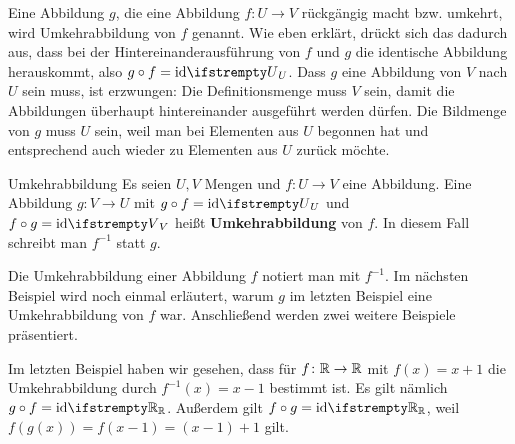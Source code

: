 \documentclass[../../main.tex]{subfiles}
\begin{document}
Eine Abbildung $g$, die eine Abbildung $f\colon U\rightarrow V$ rückgängig macht bzw. umkehrt, wird Umkehrabbildung von $f$ genannt. Wie eben erklärt, drückt sich das dadurch aus, dass bei der Hintereinanderausführung von $f$ und $g$ die identische Abbildung herauskommt, also $g\circ f=\ident[U]$. Dass $g$ eine Abbildung von $V$ nach $U$ sein muss, ist erzwungen: Die Definitionsmenge muss $V$ sein, damit die Abbildungen überhaupt hintereinander ausgeführt werden dürfen. Die Bildmenge von $g$ muss $U$ sein, weil man bei Elementen aus $U$ begonnen hat und entsprechend auch wieder zu Elementen aus $U$ zurück möchte.

\begin{definition}{Umkehrabbildung}
    Es seien $U,V$ Mengen und $f\colon U\rightarrow V$ eine Abbildung. Eine Abbildung $g\colon V\rightarrow U$ mit $g\circ f=\ident[U]$ und $f\circ g=\ident[V]$ heißt \textbf{Umkehrabbildung} von $f$. In diesem Fall schreibt man $f^{-1}$ statt $g$.
\end{definition}

Die Umkehrabbildung einer Abbildung $f$ notiert man mit $f^{-1}$. Im nächsten Beispiel wird noch einmal erläutert, warum $g$ im letzten Beispiel eine Umkehrabbildung von $f$ war. Anschließend werden zwei weitere Beispiele präsentiert.

\begin{example}{}
    Im letzten Beispiel haben wir gesehen, dass für $f\colon\mathbb{R}\rightarrow\mathbb{R}$ mit $f(x)=x+1$ die Umkehrabbildung durch $f^{-1}(x)=x-1$ bestimmt ist. Es gilt nämlich $g\circ f=\ident[\Real]$. Außerdem gilt $f\circ g=\ident[\Real]$, weil $f(g(x))=f(x-1)=(x-1)+1$ gilt.
\end{example}
\end{document}
